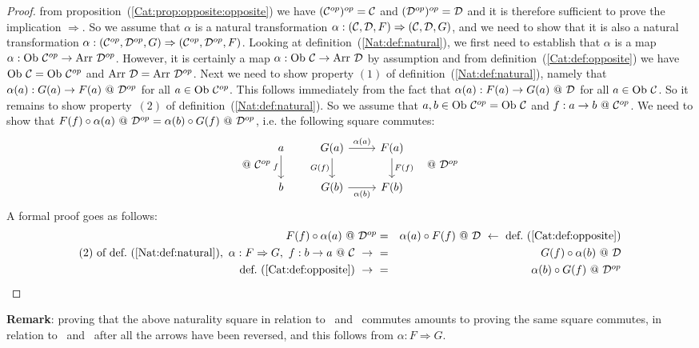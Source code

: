 \begin{proof}
    from proposition~(\ref{Cat:prop:opposite:opposite}) we have
    $(\mbox{${\cal C}^{op}$})^{op}=\mbox{$\cal C$}$ and $(\mbox{${\cal D}^{op}$})^{op}=\mbox{$\cal D$}$ and it is therefore sufficient 
    to prove the implication $\Rightarrow$. So we assume that $\alpha$ is 
    a natural transformation $\alpha:(\mbox{$\cal C$},\mbox{$\cal D$},F)\Rightarrow(\mbox{$\cal C$},\mbox{$\cal D$},G)$,
    and we need to show that it is also a natural transformation
    $\alpha:(\mbox{${\cal C}^{op}$},\mbox{${\cal D}^{op}$},G)\Rightarrow(\mbox{${\cal C}^{op}$},\mbox{${\cal D}^{op}$},F)$. Looking at 
    definition~(\ref{Nat:def:natural}), we first need to establish that
    $\alpha$ is a map $\alpha:\ob\ \Cop\to\arr\ \Dop$. However, it is 
    certainly a map $\alpha:\mbox{\rm Ob}\ \mbox{$\cal C$}\to\mbox{\rm Arr}\ \mbox{$\cal D$}$ by assumption and from 
    definition~(\ref{Cat:def:opposite}) we have $\mbox{\rm Ob}\ \mbox{$\cal C$}=\mbox{\rm Ob}\ \mbox{${\cal C}^{op}$}$ and
    $\mbox{\rm Arr}\ \mbox{$\cal D$}=\mbox{\rm Arr}\ \mbox{${\cal D}^{op}$}$. Next we need to show property $(1)$ of
    definition~(\ref{Nat:def:natural}), namely that 
    $\alpha(a):G(a)\to F(a)\ @\ \mbox{${\cal D}^{op}$}$ for all $a\in\mbox{\rm Ob}\ \mbox{${\cal C}^{op}$}$. This
    follows immediately from the fact that $\alpha(a):F(a)\to G(a)\ @\ \mbox{$\cal D$}$
    for all $a\in\mbox{\rm Ob}\ \mbox{$\cal C$}$. So it remains to show property~$(2)$ of 
    definition~(\ref{Nat:def:natural}). So we assume that $a,b\in\mbox{\rm Ob}\ \mbox{${\cal C}^{op}$}
    =\mbox{\rm Ob}\ \mbox{$\cal C$}$ and $f:a\to b\ @\ \Cop$. We need to show that 
    $F(f)\circ\alpha(a)\ @\ \Dop = \alpha(b)\circ G(f)\ @\ \Dop$, i.e.
    the following square commutes:
    \begin{eqnarray*}@\ \Cop
        &\begin{tikzcd}
            a\arrow[d,swap, "f"]
            &G(a)\arrow[r, "\alpha(a)"]\arrow[d, swap,"G(f)"]
            &F(a)\arrow[d, "F(f)"]
            \\
            b
            &G(b)\arrow[r, swap, "\alpha(b)"]
            &F(b)
        \end{tikzcd}&@\ \Dop
    \end{eqnarray*}
    A formal proof goes as follows:
    \begin{eqnarray*}F(f)\circ\alpha(a)\ @\ \Dop 
        &=&\alpha(a)\circ F(f)\ @\ \Dat
        \ \leftarrow\ \mbox{def.~(\ref{Cat:def:opposite})}\\
        \mbox{$(2)$ of def.~(\ref{Nat:def:natural})},\ 
        \alpha:F\Rightarrow G,\ f:b\to a\ @\ \Cat\ \to\ 
        &=&G(f)\circ\alpha(b)\ @\ \Dat\\
        \mbox{def.~(\ref{Cat:def:opposite})}\ \to\ 
        &=&\alpha(b)\circ G(f)\ @\ \Dop
    \end{eqnarray*}
\end{proof}

\noindent
{\bf Remark}: proving that the above naturality square in relation to \Cop\ and
\Dop\ commutes amounts to proving the same square commutes, in relation to \Cat\ 
and \Dat\ after all the arrows have been reversed, and this follows from 
$\alpha:F\Rightarrow G$.


